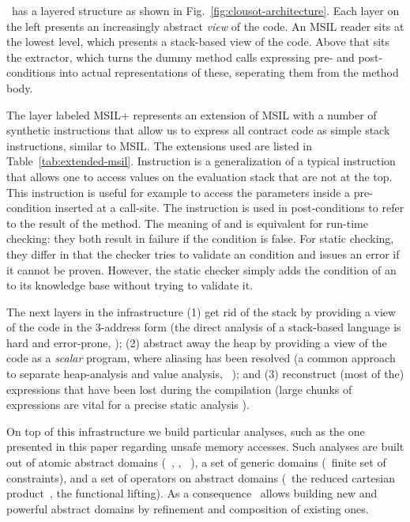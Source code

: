 \documentclass[10pt]{sigplanconf}
\begin{document}
\Clousot\ has a layered structure as shown in
Fig.~\ref{fig:clousot-architecture}.  Each layer on the left presents an
increasingly abstract \emph{view} of the code.  An MSIL reader sits at the lowest
level, which presents a stack-based view of the code. Above that sits
the \Foxtrot{} extractor, which turns the dummy method calls expressing
pre- and post-conditions into actual representations of these,
seperating them from the method body. 

The layer labeled MSIL+ represents an extension of MSIL with a number
of synthetic instructions that allow us to express all contract code
as simple stack instructions, similar to MSIL. The extensions used are
listed in Table~\ref{tab:extended-msil}. Instruction  is a
generalization of a typical  instruction that allows one to access
values on the evaluation stack that are not at the top. This
instruction is useful for example to access the parameters inside a
pre-condition inserted at a call-site. The  instruction is
used in post-conditions to refer to the result of the method. The
meaning of  and  is equivalent for run-time checking: they
both result in failure if the condition is false. For static checking,
they differ in that the checker tries to validate an  condition
and issues an error if it cannot be proven. However, the static
checker simply adds the condition of an  to its knowledge
base without trying to validate it.

The next layers in the \Clousot{} infrastructure (1) get rid of the
stack by providing a view of the code in the 3-address form (the
direct analysis of a stack-based language is hard and error-prone,
\cite{HorspoolVitek92}); (2) abstract away the heap by providing a
view of the code as a \emph{scalar} program, where aliasing has been
resolved (a common approach to separate heap-analysis and value
analysis, \eg\ \cite{VenetBrat05,Logozzo07}); and (3) reconstruct (most of
the) expressions that have been lost during the compilation (large
chunks of expressions are vital for a precise static analysis
\cite{LogozzoMaf08-2}).

On top of this infrastructure we build particular analyses, such as
the one presented in this paper regarding unsafe memory accesses. Such
analyses are built out of
atomic abstract domains (\eg\ \Intervals, \Karr,
\Pentagons~\cite{LogozzoMaf08}), a set of generic domains (\eg\ finite
set of constraints), and a set of operators on abstract domains (\eg\
the reduced cartesian product~\cite{CousotCousot79}, the functional
lifting).  As a consequence \Clousot\ allows building new and powerful
abstract domains by refinement and composition of existing ones.
\end{document}
